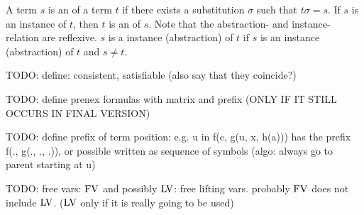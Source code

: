 
A term $s$ is an  of a term $t$ if there exists a substitution $\sigma$ such that $t\sigma = s$.
If $s$ is an instance of $t$, then $t$ is an  of $s$. Note that the abstraction- and instance-relation are reflexive. 
$s$ is a  instance (abstraction) of $t$ if $s$ is an instance (abstraction) of $t$ and $s\neq t$. 



TODO: define: consistent, satisfiable (also say that they coincide?)

TODO: define prenex formulas with matrix and prefix (ONLY IF IT STILL OCCURS IN FINAL VERSION)

TODO: define prefix of term position: e.g. u in f(c, g(u, x, h(a))) has the prefix f(., g(., ., .)), or possible written as sequence of symbols (algo: always go to parent starting at u)

TODO: free vars: $\operatorname{FV}$ and possibly $\operatorname{LV}$: free lifting vars. probably $\operatorname{FV}$ does not include $\operatorname{LV}$. ($\operatorname{LV}$ only if it is really going to be used)




